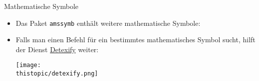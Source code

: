 \begin{frame}[fragile,t]{Mathematische Symbole}
    \begin{itemize}
        \item Das Paket \texttt{amssymb} enthält weitere mathematische Symbole:
            \begin{center}
                \code{\usepackage{amssymb}}
            \end{center}
        \item Falls man einen Befehl für ein bestimmtes mathematisches Symbol sucht, hilft der Dienst
            \href{http://detexify.kirelabs.org/classify.html}{\alert{Detexify}} weiter:
            \begin{center}
                \texttt{[image: \\thistopic/detexify.png]}
            \end{center}
    \end{itemize}
\end{frame}
